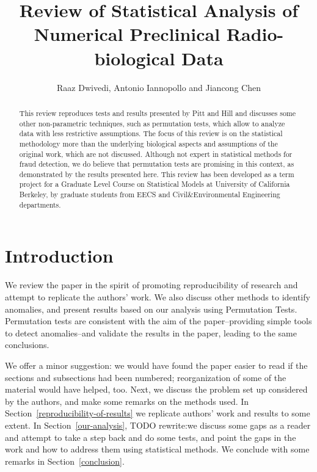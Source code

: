 \documentclass{article}
\title{Review of Statistical Analysis of Numerical Preclinical Radio-biological Data}
\author{Raaz Dwivedi,  Antonio Iannopollo and Jiancong Chen}
\begin{document}
    \maketitle



\begin{abstract}
This review reproduces tests and results
presented by Pitt and Hill and discusses some other non-parametric techniques, such as permutation tests, which allow to analyze data with less restrictive assumptions. 
The focus of this review is on the statistical methodology more than the underlying biological aspects and assumptions of the original work, which are not discussed.
Although not expert in statistical methods for fraud detection, we do believe that permutation tests are promising in this context, as demonstrated by the results presented here. 
This review has been developed as a term
project for a Graduate Level Course on Statistical Models at University of California Berkeley, by graduate
students from EECS and Civil\&Environmental Engineering departments.
\end{abstract}

\section{Introduction} %
\label{sec:introduction}


We review the paper in the spirit of promoting reproducibility of research and attempt to replicate the authors' work. We also discuss other methods to identify anomalies, and present results based on our analysis using Permutation Tests. Permutation tests are consistent with the aim of the paper--providing simple tools to detect anomalies--and validate the results in the paper, leading to the same conclusions.

We offer a minor suggestion: we would have found the paper easier to read if the sections and subsections had been numbered; reorganization of some of the material would have helped, too. Next, we discuss the problem set up considered by the authors, and make some remarks on the methods used. In Section~\ref{reproducibility-of-results} we replicate authors' work and results to some extent. 
In Section~\ref{our-analysis}, TODO rewrite:we discuss some gaps as a reader and attempt to take a step back and do some tests, and point the gaps in the work and how to address them using statistical methods. 
We conclude with some remarks in Section~\ref{conclusion}.
\end{document}
